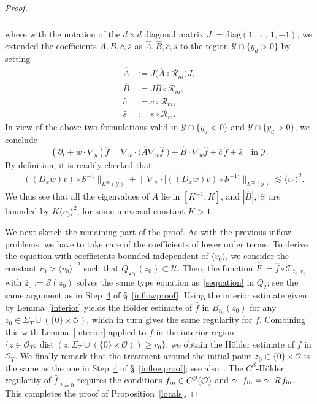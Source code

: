 \documentclass[AHL,Unicode,longabstracts,published]{cedram}
\DeclareMathOperator{\dist}{dist}
\newcommand*\p{\partial}
\newcommand*\diag{\mathrm{diag}}
\newcommand*\fin {f_{\rm in}}
\newcommand*\Rm {\mathcal{R}_m}
\newcommand*\T{\mathcal{T}}
\renewcommand*\SS {\mathcal{S}}
\newcommand*\RR {\mathcal{R}}
\newcommand*\U {\mathcal{U}}
\newcommand*\Y {\mathcal{Y}}
\newcommand*\OO {\mathcal{O}}
\newcommand{\lvv}{\langle v_0\rangle}
\begin{document}
\begin{proof}
\begin{multline*}
\begin{aligned}
\end{aligned}
\end{multline*}
where with the notation of the $d\times d$ diagonal matrix $J:=\diag(1,\,\ldots,\,1,-1)$, we extended the coefficients $\overline{A},\overline{B},\overline{c},\overline{s}$ as $\widehat{A},\widehat{B},\widehat{c},\widehat{s}$ to the region $\Y\cap\{y_d> 0\}$ by setting
\begin{align*}
\widehat{A}&:=J\big(\overline{A}\circ\Rm\big) J,\\
\widehat{B}&:=J\overline{B}\circ\Rm,\\
\widehat{c}&:=\overline{c}\circ\Rm,\\
\widehat{s}&:=\overline{s}\circ\Rm.
\end{align*}
In view of the above two formulations valid in $\Y\cap\{y_d<0\}$ and $\Y\cap\{y_d>0\}$, we conclude
\begin{equation}\label{sequation}
\left(\p_t+w\cdot\nabla_y\right)\widehat{f} =\nabla_w\cdot\big(\widehat{A}\nabla_w\widehat{f}\;\!\big) +\widehat{B}\cdot\nabla_w\widehat{f}+ \widehat{c}\,\widehat{f}+\widehat{s} \quad\text{in}\;\Y.
\end{equation}
By definition, it is readily checked that
\begin{align*}
\big\|((D_xw)v)\circ\SS^{-1}\big\|_{L^\infty(\Y)} +\big\|\nabla_w\cdot\big[((D_xw)v)\circ\SS^{-1}\big]\big\|_{L^\infty(\Y)}
\lesssim \lvv^2.
\end{align*}
We thus see that all the eigenvalues of $\widehat{A}$ lie in $[K^{-1},K]$, and $|\widehat{B}|, |\widehat{c}|$ are bounded by $K\lvv^2$, for some universal constant $K>1$.

We next sketch the remaining part of the proof. As with the previous inflow problems, we have to take care of the coefficients of lower order terms. To derive the equation with coefficients bounded independent of $\lvv$, we consider the constant $r_0\approx\lvv^{-2}$ such that $Q_{2r_0}(z_0)\subset\U$. Then, the function $\widehat{F}:=\widehat{f}\circ\T_{\overline{z}_0,r_0}$ with $\overline{z}_0:=\SS(z_0)$ solves the same type equation as~\eqref{sequation} in $Q_2$; see the same argument as in Step~\hyperref[step4]{4} of \S~\ref{inflowproof}. Using the interior estimate given by Lemma~\ref{interior} yields the H\"older estimate of $\widehat{f}$ in $B_{r_0}(z_0)$ for any $z_0\in\Sigma_T\cup(\{0\}\times\OO)$, which in turn gives the same regularity for $f$. Combining this with Lemma~\ref{interior} applied to $f$ in the interior region $\{z\in\OO_T: \dist(z,\Sigma_T\cup(\{0\}\times\OO))\ge r_0\}$, we obtain the H\"older estimate of $f$ in $\overline{\OO_T}$. We finally remark that the treatment around the initial point $z_0\in\{0\}\times\OO$ is the same as the one in Step~\hyperref[step4]{4} of \S~\ref{inflowproof}; see also~\cite[Corollary~4.6]{YZ}. The $C^\beta$-H\"older regularity of $\widehat{f}|_{t=0}$ requires the conditions $\fin\in C^\beta(\OO)$ and $\gamma_-\fin=\gamma_-\RR\fin$. This completes the proof of Proposition~\ref{locals}.
\end{proof}
\end{document}
